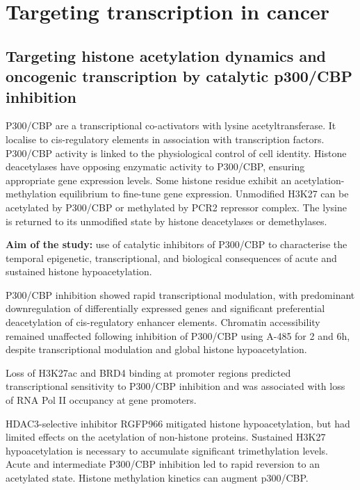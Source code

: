 \section{Targeting transcription in cancer}
\subsection{Targeting histone acetylation dynamics and oncogenic transcription by catalytic p300/CBP inhibition}
P300/CBP are a transcriptional co-activators with lysine acetyltransferase. It localise to cis-regulatory elements in association with transcription factors. P300/CBP activity is linked to the physiological control of cell identity. Histone deacetylases have opposing enzymatic activity to P300/CBP, ensuring appropriate gene expression levels.
Some histone residue exhibit an acetylation-methylation equilibrium to fine-tune gene expression.
Unmodified H3K27  can be acetylated by P300/CBP or methylated by PCR2 repressor complex. The lysine is returned to its unmodified state by histone deacetylases or demethylases.

\textbf{Aim of the study:} use of catalytic inhibitors of P300/CBP to characterise the temporal epigenetic, transcriptional, and biological consequences of acute and sustained histone hypoacetylation.

P300/CBP inhibition showed rapid transcriptional modulation, with predominant downregulation of differentially expressed genes and significant preferential deacetylation of cis-regulatory enhancer elements. Chromatin accessibility remained unaffected following inhibition of P300/CBP using A-485 for 2 and 6h, despite transcriptional modulation and global histone hypoacetylation. 

Loss of H3K27ac and BRD4 binding at promoter regions predicted transcriptional sensitivity to P300/CBP inhibition and was associated with loss of RNA Pol II occupancy at gene promoters.

HDAC3-selective inhibitor RGFP966 mitigated histone hypoacetylation, but had limited effects on the acetylation of non-histone proteins.
Sustained H3K27 hypoacetylation is necessary to accumulate significant trimethylation levels. Acute and intermediate P300/CBP inhibition led to rapid reversion to an acetylated state. Histone methylation kinetics can augment p300/CBP.


